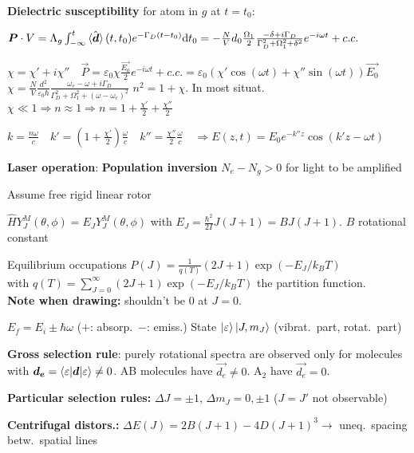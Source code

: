 \begin{squishlist}
    \textbf{Dielectric susceptibility} \qquad for atom in $g$ at $t=t_0$:
    \item $\bm{P} \cdot V  = \Lambda_g \int_{-\infty}^{t} \braket{\hat{\bm{d}}}(t,t_0) e^{{-\Gamma_D(t-t_0)}} \textrm{d} t_0 = - \frac{N}{V}d_0 \frac{\Omega_1}{2} \frac{-\delta + i \Gamma_D}{\Gamma_D^2 + \Omega_1^2 + \delta^2}e^{-i\omega t} + c.c.$ 
    \item $\chi = \chi' + i \chi'' \quad \vec{P} = \varepsilon_0 \chi \frac{\vec{E_0}}{2} e^{-i \omega t} +c.c. = \varepsilon_0 (\chi' \cos(\omega t) + \chi'' \sin(\omega t)) \vec{E_0} $\\
    $\chi = \frac{N}{V} \frac{d^2}{\varepsilon_0 \hbar} \frac{\omega_e - \omega + i\Gamma_D}{\Gamma_D^2 + \Omega_1^2 + (\omega - \omega_e)^2}$ \quad $n^2 = 1 + \chi$. In most situat.\ $\chi \ll 1 \Rightarrow n \approx 1 \Rightarrow n = 1 + \frac{\chi'}{2} + \frac{\chi''}{2}$
    \item $k = \frac{n \omega}{c} \quad k'=\left(1 + \frac{\chi'}{2}\right)\frac{\omega }{c} \quad k'' = \frac{\chi''}{2}\frac{\omega}{c} \quad \Longrightarrow E(z,t) = E_0 e^{-k'' z} \cos(k'z - \omega t)$
    
    \squishline
    
    \item \textbf{Laser operation}:
    \textbf{Population inversion} $N_e - N_g > 0$ for light to be amplified
\end{squishlist}

\begin{squishlist}
    \item Assume free rigid linear rotor
    \item $\hat{H} Y_J^M(\theta, \phi) = E_J Y_J^M(\theta, \phi)$ with $E_J = \frac{\hbar^2}{2I} J (J+1) = B J(J+1)$. $B$ rotational constant
    \item Equilibrium occupations $P(J) = \frac{1}{q(T)} (2J+1) \exp(-E_J / k_B T)$ \\
    with $q(T) = \sum_{J=0}^{\infty} (2J+1) \exp(-E_J / k_B T)$ the partition function. \\ 
    \textbf{Note when drawing:} shouldn't be $0$ at $J=0$.

    \item $E_f = E_i \pm \hbar \omega$ ($+$: absorp.\, $-$: emiss.) \hspace{-0.3cm}
    \squishsep State $\ket{\varepsilon} \ket{J, m_J}$ (\elec vibrat.\ part, rotat.\ part)
    \item \textbf{Gross selection rule}: purely rotational spectra are observed only for molecules with $\bm{d_e} = \braket{\varepsilon|\bm{d}|\varepsilon} \neq 0$. AB molecules have $\vec{d_e} \neq 0$. A$_2$ have $\vec{d_e} = 0$.
    \item \textbf{Particular selection rules:} $\Delta J = \pm 1$, $\Delta m_J = 0, \pm 1$ ($J=J'$ not observable)
    \item \textbf{Centrifugal distors.:} $\Delta E(J) = 2B (J+1) - 4D(J+1)^3 \rightarrow$ uneq.\ spacing betw.\ spatial lines
\end{squishlist}

